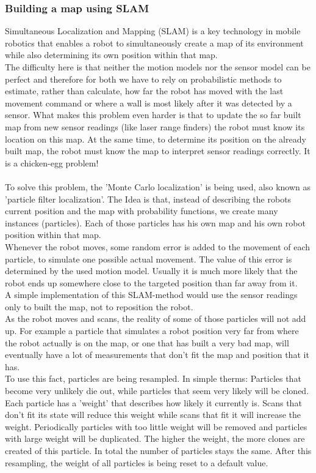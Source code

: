 \documentclass[a4paper,
  twoside, %
  headlines=2.1 %
  ]{scrartcl}
\begin{document}
\subsubsection{Building a map using SLAM}
Simultaneous Localization and Mapping (SLAM) is a key technology in mobile robotics that enables a robot to simultaneously create a map of its environment while also determining its own position within that map.\\
The difficulty here is that neither the motion models nor the sensor model can be perfect and therefore for both we have to rely on probabilistic methods to estimate, rather than calculate, how far the robot has moved with the last movement command or where a wall is most likely after it was detected by a sensor. What makes this problem even harder is that to update the so far built map from new sensor readings (like laser range finders) the robot must know its location on this map. At the same time, to determine its position on the already built map, the robot must know the map to interpret sensor readings correctly. It is a chicken-egg problem!\\
\\
To solve this problem, the 'Monte Carlo localization' is being used, also known as 'particle filter localization'. The Idea is that, instead of describing  the robots current position and the map with probability functions, we create many instances (particles). Each of those particles has his own map and his own robot position within that map.\\
Whenever the robot moves, some random error is added to the movement of each particle, to simulate one possible actual movement. The value of this error is determined by the used motion model. Usually it is much more likely that the robot ends up somewhere close to the targeted position than far away from it.\\
A simple implementation of this SLAM-method would use the sensor readings only to built the map, not to reposition the robot.\\
As the robot moves and scans, the reality of some of those particles will not add up. For example a particle that simulates a robot position very far from where the robot actually is on the map, or one that has built a very bad map, will eventually have a lot of measurements that don't fit the map and position that it has.\\
To use this fact, particles are being resampled. In simple therms: Particles that become very unlikely die out, while particles that seem very likely will be cloned. Each particle has a 'weight' that describes how likely it currently is. Scans that don't fit its state will reduce this weight while scans that fit it will increase the weight. Periodically particles with too little weight will be removed and particles with large weight will be duplicated. The higher the weight, the more clones are created of this particle. In total the number of particles stays the same. After this resampling, the weight of all particles is being reset to a default value.\\
\end{document}
